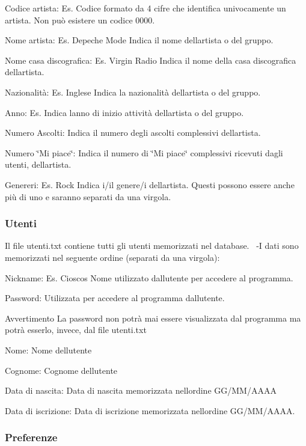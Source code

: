 \begin{DoxyEnumerate}
\item Codice artista\+: Es. Codice formato da 4 cifre che identifica univocamente un artista. Non può esistere un codice 0000.
\item Nome artista\+: Es. Depeche Mode Indica il nome dell\textquotesingle{}artista o del gruppo.
\item Nome casa discografica\+: Es. Virgin Radio Indica il nome della casa discografica dell\textquotesingle{}artista.
\item Nazionalità\+: Es. Inglese Indica la nazionalità dell\textquotesingle{}artista o del gruppo.
\item Anno\+: Es. Indica l\textquotesingle{}anno di inizio attività dell\textquotesingle{}artista o del gruppo.
\item Numero Ascolti\+: Indica il numero degli ascolti complessivi dell\textquotesingle{}artista.
\item Numero \char`\"{}\+Mi piace\char`\"{}\+: Indica il numero di \char`\"{}\+Mi piace\char`\"{} complessivi ricevuti dagli utenti, dell\textquotesingle{}artista.
\item Genereri\+: Es. Rock Indica i/il genere/i dell\textquotesingle{}artista. Questi possono essere anche più di uno e saranno separati da una virgola. 
\end{DoxyEnumerate}\hypertarget{index_utenti}{}\subsubsection{Utenti}\label{index_utenti}
Il file utenti.\+txt contiene tutti gli utenti memorizzati nel database.~\newline
 -\/I dati sono memorizzati nel seguente ordine (separati da una virgola)\+:
\begin{DoxyEnumerate}
\item Nickname\+: Es. Cioscos Nome utilizzato dall\textquotesingle{}utente per accedere al programma.
\item Password\+: Utilizzata per accedere al programma dall\textquotesingle{}utente. \begin{DoxyWarning}{Avvertimento}
La password non potrà mai essere visualizzata dal programma ma potrà esserlo, invece, dal file utenti.\+txt
\end{DoxyWarning}

\item Nome\+: Nome dell\textquotesingle{}utente
\item Cognome\+: Cognome dell\textquotesingle{}utente
\item Data di nascita\+: Data di nascita memorizzata nell\textquotesingle{}ordine G\+G/\+M\+M/\+A\+A\+AA
\item Data di iscrizione\+: Data di iscrizione memorizzata nell\textquotesingle{}ordine G\+G/\+M\+M/\+A\+A\+AA. 
\end{DoxyEnumerate}\hypertarget{index_preferenze}{}\subsubsection{Preferenze}\label{index_preferenze}
